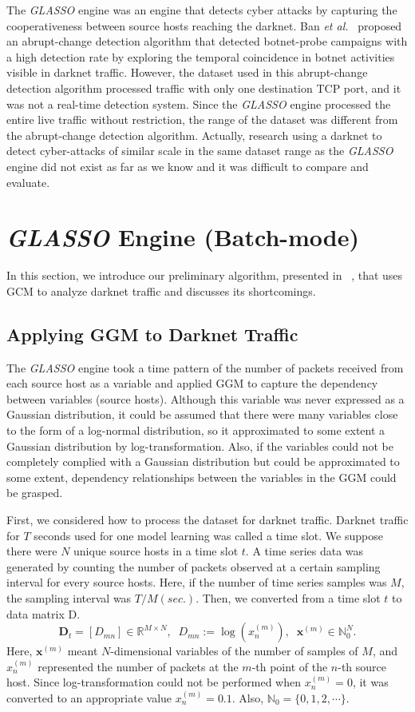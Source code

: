 \documentclass[conference]{IEEEtran}
\begin{document}
The {\it GLASSO} engine was an engine that detects cyber attacks by capturing the cooperativeness between source hosts reaching the darknet.
Ban {\it et al.}~\cite{Ban} proposed an abrupt-change detection algorithm that detected botnet-probe campaigns with a high detection rate by exploring the temporal coincidence in botnet activities visible in darknet traffic.
However, the dataset used in this abrupt-change detection algorithm processed traffic with only one destination TCP port, and it was not a real-time detection system.
Since the {\it GLASSO} engine processed the entire live traffic without restriction, the range of the dataset was different from the abrupt-change detection algorithm.
Actually, research using a darknet to detect cyber-attacks of similar scale in the same dataset range as the {\it GLASSO} engine did not exist as far as we know and it was difficult to compare and evaluate.




\section{{\it GLASSO} Engine (Batch-mode)}
In this section, we introduce our preliminary algorithm, presented in ~\cite{Han}, that uses GCM to analyze darknet traffic and discusses its shortcomings.


\subsection{Applying GGM to Darknet Traffic}
The {\it GLASSO} engine took a time pattern of the number of packets received from each source host as a variable and applied GGM to capture the dependency between variables (source hosts).
Although this variable was never expressed as a Gaussian distribution, it could be assumed that there were many variables close to the form of a log-normal distribution, so it approximated to some extent a Gaussian distribution by log-transformation.
Also, if the variables could not be completely complied with a Gaussian distribution but could be approximated to some extent, dependency relationships between the variables in the GGM could be grasped.

First, we considered how to process the dataset for darknet traffic.
Darknet traffic for $T$ seconds used for one model learning was called a time slot.
We suppose there were $N$ unique source hosts in a time slot $t$.
A time series data was generated by counting the number of packets observed at a certain sampling interval for every source hosts.
Here, if the number of time series samples was $M$, the sampling interval was $T/M (sec.)$.
Then, we converted from a time slot $t$ to data matrix D.
\begin{equation*}
\bm{D}_t=[D_{mn}]\in\mathbb{R}^{M \times N},
\;\;D_{mn} := \log(x_n^{(m)}),
\;\;\bm{x}^{(m)}\in\mathbb{N}_0^{N}.
\end{equation*}
Here, $\bm{x}^{(m)}$ meant $N$-dimensional variables of the number of samples of $M$, and $x_n^{(m)}$ represented the number of packets at the $m$-th point of the $n$-th source host.
Since log-transformation could not be performed when $x_n^{(m)}=0$, it was converted to an appropriate value $x_n^{(m)}=0.1$.
Also, $\mathbb{N}_0=\{0,1,2,\cdots\}$.
\end{document}

